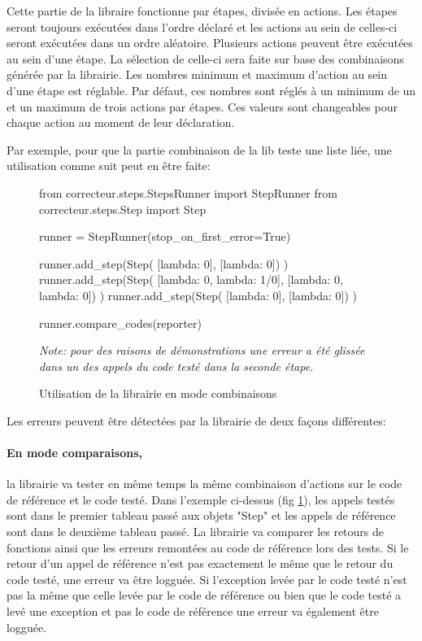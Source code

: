 \documentclass[a4paper]{report}
\begin{document}
Cette partie de la libraire fonctionne par étapes, divisée en actions.
Les étapes seront toujours exécutées dans l'ordre déclaré et les actions au sein de celles-ci seront exécutées dans un ordre aléatoire.
Plusieurs actions peuvent être exécutées au sein d'une étape.
La sélection de celle-ci sera faite sur base des combinaisons générée par la librairie.
Les nombres minimum et maximum d'action au sein d'une étape est réglable.
Par défaut, ces nombres sont réglés à un minimum de un et un maximum de trois actions par étapes.
Ces valeurs sont changeables pour chaque action au moment de leur déclaration.

Par exemple, pour que la partie combinaison de la lib teste une liste liée, une utilisation comme suit peut en être faite:


\begin{figure}[ht]
\begin{python}
from correcteur.steps.StepsRunner import StepRunner
from correcteur.steps.Step import Step

runner = StepRunner(stop_on_first_error=True)

runner.add_step(Step(
	[lambda: 0],
	[lambda: 0])
)
runner.add_step(Step(
	[lambda: 0, lambda: 1/0],
	[lambda: 0, lambda: 0])
)
runner.add_step(Step(
	[lambda: 0],
	[lambda: 0])
)

runner.compare_codes(reporter)
\end{python}
	\caption{Utilisation de la librairie en mode combinaisons}
	
	\textit{Note: pour des raisons de démonstrations une erreur a été glissée dans un des appels du code testé dans la seconde étape.}	
	
	\label{fig:combinaisons_ref}
\end{figure}


Les erreurs peuvent être détectées par la librairie de deux façons différentes:

\paragraph{En mode comparaisons,} la librairie va tester en même temps la même combinaison d'actions sur le code de référence et le code testé.
Dans l'exemple ci-dessus (fig \ref{fig:combinaisons_ref}), les appels testés sont dans le premier tableau passé aux objets "Step" et les appels de référence sont dans le deuxième tableau passé.
La librairie va  comparer les retours de fonctions ainsi que les erreurs remontées au code de référence lors des tests.
Si le retour d'un appel de référence n'est pas exactement le même que le retour du code testé, une erreur va être logguée.
Si l'exception levée par le code testé n'est pas la même que celle levée par le code de référence ou bien que le code testé a levé une exception et pas le code de référence une erreur va également être logguée. 
\end{document}
